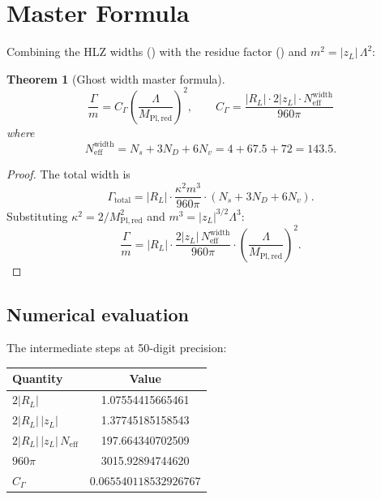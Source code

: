 \documentclass[11pt,a4paper]{article}
\newcommand{\MPlred}{M_{\mathrm{Pl,red}}}
\newcommand{\Neff}{N_{\mathrm{eff}}}
\newtheorem{theorem}{Theorem}[section]
\begin{document}
\section{Master Formula}
\label{sec:master}

Combining the HLZ widths () with the residue factor
() and $m^2 = |z_L|\,\Lambda^2$:

\begin{theorem}[Ghost width master formula]
\label{thm:master}
\begin{equation}\label{eq:master}
  \boxed{
  \frac{\Gamma}{m}
  = C_\Gamma \left(\frac{\Lambda}{\MPlred}\right)^{\!2},
  \qquad
  C_\Gamma
  = \frac{|R_L| \cdot 2|z_L| \cdot \Neff^{\mathrm{width}}}
         {960\pi}
  }
\end{equation}
where
\begin{equation}
  \Neff^{\mathrm{width}}
  = N_s + 3N_D + 6N_v
  = 4 + 67.5 + 72
  = 143.5.
\end{equation}
\end{theorem}

\begin{proof}
The total width is
\begin{equation}
  \Gamma_{\mathrm{total}}
  = |R_L| \cdot \frac{\kappa^2 m^3}{960\pi}
    \cdot (N_s + 3N_D + 6N_v).
\end{equation}
Substituting $\kappa^2 = 2/\MPlred^2$ and $m^3 = |z_L|^{3/2}\Lambda^3$:
\begin{equation}
  \frac{\Gamma}{m}
  = |R_L| \cdot \frac{2|z_L|\,\Neff^{\mathrm{width}}}{960\pi}
    \cdot \left(\frac{\Lambda}{\MPlred}\right)^{\!2}.
\end{equation}
\end{proof}

\subsection{Numerical evaluation}

The intermediate steps at 50-digit precision:

\begin{center}
\begin{tabular}{lc}
\toprule
Quantity & Value \\
\midrule
$2|R_L|$ & 1.07554415665461 \\
$2|R_L|\,|z_L|$ & 1.37745185158543 \\
$2|R_L|\,|z_L|\,\Neff$ & 197.664340702509 \\
$960\pi$ & 3015.92894744620 \\
$C_\Gamma$ & $\mathbf{0.065540118532926767}$ \\
\bottomrule
\end{tabular}
\end{center}
\end{document}

